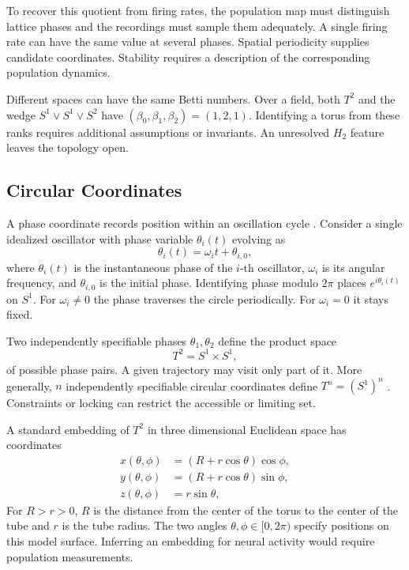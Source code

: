 \documentclass[12pt,a4paper]{article}
\begin{document}
To recover this quotient from firing rates, the population map must distinguish lattice phases and the recordings must sample them adequately. A single firing rate can have the same value at several phases. Spatial periodicity supplies candidate coordinates. Stability requires a description of the corresponding population dynamics.

Different spaces can have the same Betti numbers. Over a field, both $T^2$ and the wedge $S^1\vee S^1\vee S^2$ have $(\beta_0,\beta_1,\beta_2)=(1,2,1)$. Identifying a torus from these ranks requires additional assumptions or invariants. An unresolved $H_2$ feature leaves the topology open.

\subsection{Circular Coordinates}

A phase coordinate records position within an oscillation cycle \cite{Winfree2001, Strogatz2015}.
Consider a single idealized oscillator with phase variable $\theta_i(t)$ evolving as
\begin{equation}\label{eq:oscillator}
  \theta_i(t) = \omega_i t + \theta_{i,0},
\end{equation}
where $\theta_i(t)$ is the instantaneous phase of the $i$-th oscillator, $\omega_i$ is its angular frequency, and $\theta_{i,0}$ is the initial phase.
Identifying phase modulo $2\pi$ places $e^{i\theta_i(t)}$ on $S^1$. For $\omega_i\ne0$ the phase traverses the circle periodically. For $\omega_i=0$ it stays fixed.

Two independently specifiable phases $\theta_1,\theta_2$ define the product space
\begin{equation}\label{eq:torus}
  T^2 = S^1 \times S^1,
\end{equation}
of possible phase pairs. A given trajectory may visit only part of it.
More generally, $n$ independently specifiable circular coordinates define $T^n = (S^1)^n$ \cite{Strogatz2015}. Constraints or locking can restrict the accessible or limiting set.

A standard embedding of $T^2$ in three dimensional Euclidean space has coordinates
\begin{align}
  x(\theta, \phi) &= (R + r\cos\theta)\cos\phi, \label{eq:torus_x} \\
  y(\theta, \phi) &= (R + r\cos\theta)\sin\phi, \label{eq:torus_y} \\
  z(\theta, \phi) &= r\sin\theta, \label{eq:torus_z}
\end{align}
For $R>r>0$, $R$ is the distance from the center of the torus to the center of the tube and $r$ is the tube radius. The two angles $\theta,\phi\in[0,2\pi)$ specify positions on this model surface. Inferring an embedding for neural activity would require population measurements.
\end{document}
